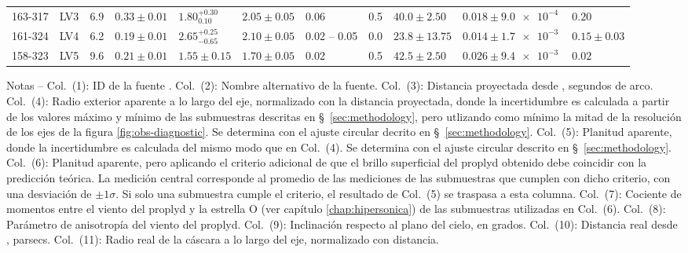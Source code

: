 \begin{landscape}
\begin{table}
\begin{adjustbox}{width=1.35\textwidth}
\begin{tabular}{llrllllrlll}
  163-317  & LV3      &   6.9  &  $0.33 \pm 0.01$  &  $1.80^{+0.30}_{0.10}$   &  $2.05 \pm 0.05$     &  0.06  &  0.5  &  $40.0 \pm 2.50$   &  $0.018 \pm \SI{9.0e-4}{}$  &  $0.20$  \\
 161-324  & LV4      &   6.2  &  $0.19 \pm 0.01$  &  $2.65^{+0.25}_{-0.65}$   &  $2.10 \pm 0.05$     &  0.02 -- 0.05  &  0.0  &  $23.8 \pm 13.75$  &  $0.014 \pm \SI{1.7e-3}{}$  &  $0.15 \pm 0.03$  \\
 158-323  & LV5      &   9.6  &  $0.21 \pm 0.01$  &  $1.55 \pm 0.15$   &  $1.70 \pm 0.05$     &  0.02  &  0.5  &  $42.5 \pm 2.50$   &  $0.026 \pm \SI{9.4e-3}{}$  &  $0.02$  \\
\bottomrule
\end{tabular}
\end{adjustbox}
\begin{minipage}{0.95\linewidth}
\footnotesize
  Notas --
%
  Col.~(1): ID de la fuente \citep{ODell:1994a}.
%
  Col.~(2): Nombre alternativo de la fuente.
% 
  Col.~(3): Distancia proyectada desde \thC{}, segundos de arco.
%
  Col.~(4): Radio exterior aparente a lo largo del eje, normalizado con la distancia proyectada, donde la incertidumbre es calculada a partir de los valores máximo y mínimo de las submuestras descritas en \S~\ref{sec:methodology}, pero utlizando como mínimo la mitad de la resolución de los ejes de la figura \ref{fig:obs-diagnostic}. Se determina con el ajuste circular decrito en \S~\ref{sec:methodology}.
% 
  Col.~(5): Planitud aparente, donde la incertidumbre es calculada del mismo modo que en Col.~(4). Se determina con el ajuste circular descrito en \S~\ref{sec:methodology}.
% 
  Col.~(6): Planitud aparente, pero aplicando el criterio adicional de que el brillo superficial del proplyd obtenido debe coincidir con la predicción teórica. La medición central corresponde al promedio de las mediciones de las submuestras que cumplen con dicho criterio, con una desviación de $\pm 1\sigma$. Si solo una submuestra cumple el criterio, el resultado de Col.~(5) se traspasa a esta columna. 
%
  Col.~(7): Cociente de momentos entre el viento del proplyd y la estrella O (ver capítulo \ref{chap:hipersonica}) de las submuestras utilizadas en Col.~(6). 
% 
  Col.~(8): Parámetro de anisotropía del viento del proplyd.
% 
  Col.~(9): Inclinación respecto al plano del cielo, en grados.
% 
  Col.~(10): Distancia real desde \thC{}, parsecs.
%
  Col.~(11): Radio real de la cáscara a lo largo del eje, normalizado con distancia.

\end{minipage}
\end{table}
\end{landscape}


